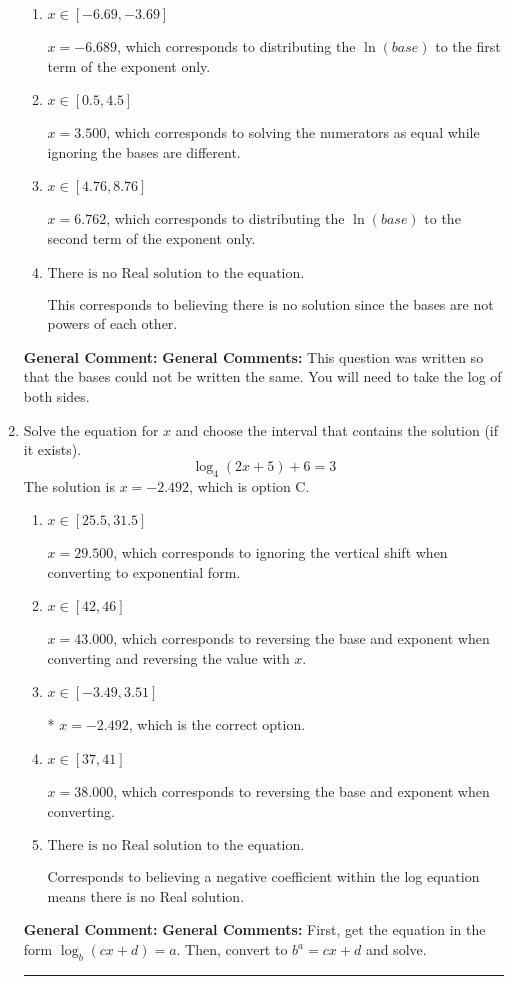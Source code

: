 \documentclass{extbook}[14pt]
\newcommand{\litem}[1]{\item #1

\rule{\textwidth}{0.4pt}}
\begin{document}
\begin{enumerate}
{\begin{enumerate}[label=\Alph*.]
* $x = -12.922$, which is the correct option.
\item \( x \in [-6.69, -3.69] \)

$x = -6.689$, which corresponds to distributing the $\ln(base)$ to the first term of the exponent only.
\item \( x \in [0.5, 4.5] \)

$x = 3.500$, which corresponds to solving the numerators as equal while ignoring the bases are different.
\item \( x \in [4.76, 8.76] \)

$x = 6.762$, which corresponds to distributing the $\ln(base)$ to the second term of the exponent only.
\item \( \text{There is no Real solution to the equation.} \)

This corresponds to believing there is no solution since the bases are not powers of each other.
\end{enumerate}

\textbf{General Comment:} \textbf{General Comments:} This question was written so that the bases could not be written the same. You will need to take the log of both sides.
}
\litem{
Solve the equation for $x$ and choose the interval that contains the solution (if it exists).
\[ \log_{4}{(2x+5)}+6 = 3 \]The solution is \( x = -2.492 \), which is option C.\begin{enumerate}[label=\Alph*.]
\item \( x \in [25.5, 31.5] \)

$x = 29.500$, which corresponds to ignoring the vertical shift when converting to exponential form.
\item \( x \in [42, 46] \)

$x = 43.000$, which corresponds to reversing the base and exponent when converting and reversing the value with $x$.
\item \( x \in [-3.49, 3.51] \)

* $x = -2.492$, which is the correct option.
\item \( x \in [37, 41] \)

$x = 38.000$, which corresponds to reversing the base and exponent when converting.
\item \( \text{There is no Real solution to the equation.} \)

Corresponds to believing a negative coefficient within the log equation means there is no Real solution.
\end{enumerate}

\textbf{General Comment:} \textbf{General Comments:} First, get the equation in the form $\log_b{(cx+d)} = a$. Then, convert to $b^a = cx+d$ and solve.
}
\end{enumerate}
\end{document}
